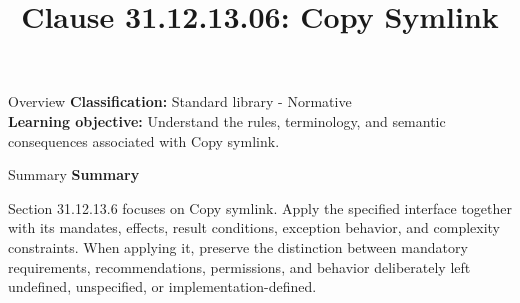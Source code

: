\documentclass[10pt,letterpaper]{article}
\title{Clause 31.12.13.06: Copy Symlink}
\author{}
\date{}
\begin{document}
\maketitle
\begin{CornellOverviewBox}{Overview}
\textbf{Classification:} Standard library - Normative\\[2pt]
\textbf{Learning objective:} Understand the rules, terminology, and semantic consequences associated with Copy symlink.
\end{CornellOverviewBox}\begin{CornellSummaryBox}{Summary}
{\sffamily\bfseries\color{Accent} Summary}\par\vspace{3pt}Section 31.12.13.6 focuses on Copy symlink. Apply the specified interface together with its mandates, effects, result conditions, exception behavior, and complexity constraints. When applying it, preserve the distinction between mandatory requirements, recommendations, permissions, and behavior deliberately left undefined, unspecified, or implementation-defined.
\end{CornellSummaryBox}
\end{document}
